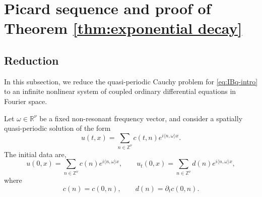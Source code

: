 \documentclass[12pt,reqno,tbtags]{amsart}
\newcommand\1{\mathbbm{1}}
\begin{document}
\section{Picard sequence and proof of Theorem \ref{thm:exponential decay}}\label{sec:2}



\subsection{Reduction}\label{sec:reduction}

In this subsection, we reduce the quasi-periodic Cauchy problem for
\eqref{eq:IBq-intro}
to an infinite nonlinear system of coupled ordinary differential equations in Fourier space.

Let $\omega\in\mathbb{R}^{\nu}$ be a fixed non-resonant frequency vector, and consider a spatially quasi-periodic solution of the form
\begin{equation*}
u(t,x)=\sum_{n\in\mathbb{Z}^{\nu}} c(t,n)e^{i\langle n,\omega\rangle x}.
\end{equation*}
The initial data are,
\begin{equation*}
u(0,x)=\sum_{n\in\mathbb{Z}^{\nu}} c(n)e^{i\langle n,\omega\rangle x},
\qquad
u_t(0,x)=\sum_{n\in\mathbb{Z}^{\nu}} d(n)e^{i\langle n,\omega\rangle x},
\end{equation*}
where
\[
c(n)=c(0,n), \qquad d(n)=\partial_t c(0,n).
\]
\end{document}
